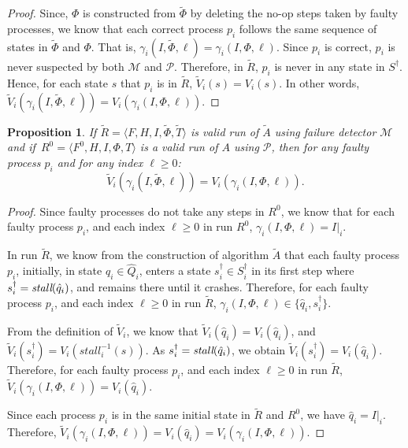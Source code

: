 \documentclass[11pt]{article}
\newtheorem{proposition}{Proposition}[section]
\newcommand{\ident}[1]{\textit{#1}\rule{0cm}{1ex}}
\newcommand{\PFD}{\ensuremath{\mathcal{P}}}
\newcommand{\MFD}{\ensuremath{\mathcal{M}}}
\newcommand{\TrAlg}{\widetilde{A}}
\begin{document}
\begin{proof}
Since, $\Phi$ is constructed from $\widetilde{\Phi}$ by deleting the
     no-op steps taken by faulty processes, we know that each correct
     process $p_i$ follows the same sequence of states in
     $\widetilde{\Phi}$ and $\Phi$.
That is, $\gamma_i(I,\widetilde{\Phi},\ell) = \gamma_i(I,\Phi,\ell)$.
Since $p_i$ is correct, $p_i$ is never suspected by both $\MFD$ and
     $\PFD$.
Therefore, in $\widetilde{R}$, $p_i$ is never in any state in
     $S^\dagger$.
Hence, for each state $s$ that $p_i$ is in $\widetilde{R}$,
     $\widetilde{V}_i(s) = V_i(s)$.
In other words, $\widetilde{V}_i(\gamma_i(I,\widetilde{\Phi},\ell)) =
     V_i(\gamma_i(I,\Phi,\ell))$.
\end{proof}



\begin{proposition}\label{prop:faultyProcessSameVi}
If $\widetilde{R}=\langle F, H, I, \widetilde{\Phi}, \widetilde{T}
     \rangle$  is valid run of $\TrAlg$ using failure detector $\MFD$
     and if~$R^0=\langle
     F^0, H, I, \Phi, T \rangle$ is a valid run of $A$ using $\PFD$,
     then for any faulty process $p_i$ and for any index $\ell\ge 0$:
$$\widetilde{V}_i(\gamma_i(I,\widetilde{\Phi},\ell)) =
     V_i(\gamma_i(I,\Phi,\ell)).$$ 

\end{proposition} 

\begin{proof}
Since faulty processes do not take any steps in $R^0$, we know that
     for each faulty process $p_i$, and each index $\ell \geq 0$ in
     run $R^0$, $\gamma_i(I,\Phi,\ell) = I|_i$.

In run $\widetilde{R}$, we know from the construction of algorithm
     $\TrAlg$ that each faulty process $p_i$, initially, in state
     $\hat{q}_i \in \hat{Q}_i$, enters a state $s^\dagger_i \in
     S^\dagger_i$ in its first step where $s^\dagger_i =
     \ident{stall}(\hat{q}_i)$, and remains there until it crashes.
Therefore, for each faulty process $p_i$, and each index $\ell \geq 0$
     in run $\widetilde{R}$, $\gamma_i(I,\Phi,\ell) \in \{\hat{q}_i,
     s^\dagger_i\}$.

From the definition of $\widetilde{V}_i$, we know that
     $\widetilde{V}_i(\hat{q}_i) = V_i(\hat{q}_i)$, and
     $\widetilde{V}_i(s^{\dagger}_i) = V_i(stall^{-1}_i(s))$.
As $s^\dagger_i = \ident{stall}(\hat{q}_i)$, we obtain
     $\widetilde{V}_i(s^\dagger_i) = V_i(\hat{q}_i)$.
Therefore, for each faulty process $p_i$, and each index $\ell \geq 0$
     in run $\widetilde{R}$, $\widetilde{V}_i(\gamma_i(I,\Phi,\ell)) =
     V_i(\hat{q}_i)$.

Since each process $p_i$ is in the same initial state in
     $\widetilde{R}$ and $R^0$, we have $\hat{q}_i = I|_i$.
Therefore, $\widetilde{V}_i(\gamma_i(I,\Phi,\ell)) = V_i(\hat{q}_i) =
     V_i(\gamma_i(I,\Phi,\ell))$.
\end{proof}
\end{document}
